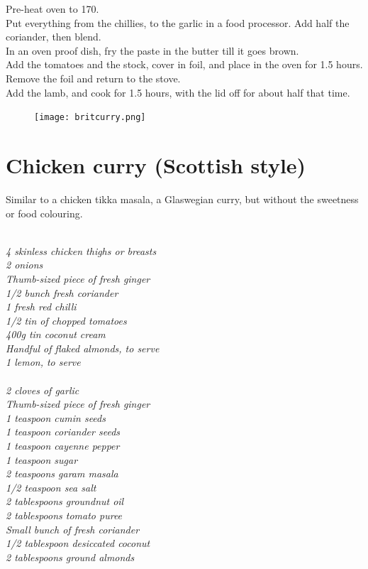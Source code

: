 \documentclass{tufte-book}
\begin{document}
\smallskip
Pre-heat oven to 170\celsius.
\\Put everything from the chillies, to the garlic in a food processor. Add half the coriander, then blend.
\\In an oven proof dish, fry the paste in the butter till it goes brown.
\\Add the tomatoes and the stock, cover in foil, and place in the oven for 1.5 hours.
\\Remove the foil and return to the stove.
\\Add the lamb, and cook for 1.5 hours, with the lid off for about half that time.


\begin{figure}[h]
  \texttt{[image: britcurry.png]}%
\end{figure}

\section{Chicken curry (Scottish style)}

Similar to a chicken tikka masala, a Glaswegian curry, but without the sweetness or food colouring.

\smallskip
{}
\\\emph{4 skinless chicken thighs or breasts
\\2 onions
\\Thumb-sized piece of fresh ginger
\\1/2 bunch fresh coriander
\\1 fresh red chilli
\\1/2 tin of chopped tomatoes
\\400g tin coconut cream
\\Handful of flaked almonds, to serve
\\1 lemon, to serve}
\\
\\\emph{2 cloves of garlic
\\Thumb-sized piece of fresh ginger
\\1 teaspoon cumin seeds
\\1 teaspoon coriander seeds
\\1 teaspoon cayenne pepper
\\1 teaspoon sugar
\\2 teaspoons garam masala
\\1/2 teaspoon sea salt
\\2 tablespoons groundnut oil
\\2 tablespoons tomato puree
\\Small bunch of fresh coriander
\\1/2 tablespoon desiccated coconut
\\2 tablespoons ground almonds}
\end{document}
